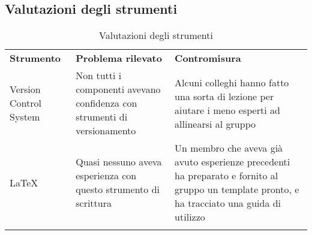 \documentclass[../piano_di_qualifica.tex]{subfiles}
\begin{document}
\subsection{Valutazioni degli strumenti}
\label{sub:valut_strumenti}

\begin{center}
	\begin{longtable}{|p{3cm}|p{4.5cm}|p{4.5cm}|}
		\hline
		\rowcolor{lightgray}
		\textbf{Strumento} & \textbf{Problema rilevato} & \textbf{Contromisura} \\
		Version Control System & Non tutti i componenti avevano confidenza con strumenti di versionamento & Alcuni colleghi hanno fatto una sorta di lezione per aiutare i meno esperti ad allinearsi al gruppo \\
		\LaTeX & Quasi nessuno aveva esperienza con questo strumento di scrittura & Un membro che aveva già avuto esperienze precedenti ha preparato e fornito al gruppo un template pronto, e ha tracciato una guida di utilizzo \\
		\hline
		\rowcolor{white}
		\caption{Valutazioni degli strumenti}
	\end{longtable}
\end{center}
\end{document}
